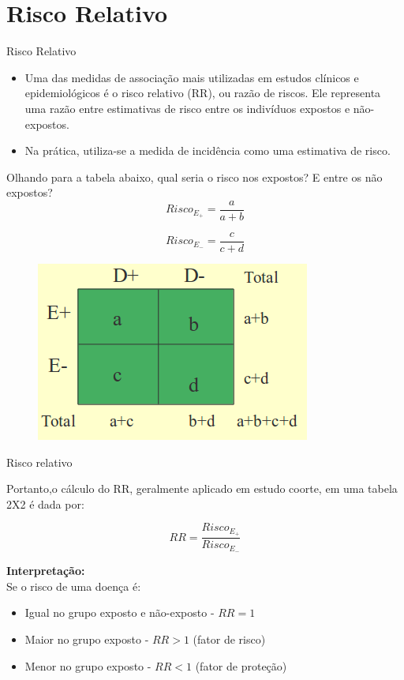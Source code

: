\documentclass[9pt]{beamer}
\begin{document}
\section{Risco Relativo}
\begin{frame}{Risco Relativo}{}

\begin{itemize}
  \item Uma das medidas de associação mais utilizadas em estudos
    clínicos e epidemiológicos é o risco relativo (RR), ou razão de
    riscos. Ele representa uma razão entre estimativas de risco entre os
    indivíduos expostos e não-expostos.
 \item Na prática, utiliza-se a medida de incidência como uma estimativa
   de risco.

\end{itemize}

Olhando para a tabela abaixo, qual seria o risco nos expostos?
E entre os não expostos?\\
$$ Risco_{E_+} = \frac{a}{a+b} $$

$$Risco_{E_-} = \frac{c}{c+d} $$


\begin{figure}[!htb]
    \centering
    \includegraphics[scale=0.3]{tab.png}
\end{figure}



\end{frame}


\begin{frame}{Risco relativo}{}

Portanto,o cálculo do RR, geralmente aplicado em estudo coorte, em uma
tabela 2X2 é dada por:

$$ RR = \frac{Risco_{E_+}}{Risco_{E_-}}$$

\textbf{Interpretação:}\\
Se o risco de uma doença é:

\begin{itemize}
  \item Igual no grupo exposto e não-exposto - $RR=1$
  \item Maior no grupo exposto - $RR > 1$ (fator de risco)
  \item Menor no grupo exposto - $RR < 1$ (fator de proteção)
\end{itemize}


\end{frame}
\end{document}
